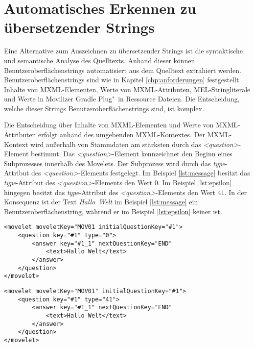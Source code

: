 \section{Automatisches Erkennen zu übersetzender Strings}
Eine Alternative zum Auszeichnen zu übersetzender Strings ist die syntaktische und semantische Analyse des Quelltexts. Anhand dieser können Benutzeroberflächenstrings automatisiert aus dem Quelltext extrahiert werden.
\autocite[Vgl.][S. 556]{Wang.2009}
\autocite[Vgl.][S. 6]{Leiva.2015}
Benutzeroberflächenstrings sind wie in Kapitel \ref{chp:anforderungen} festgestellt Inhalte von \ac{MXML}-Elementen, Werte von \ac{MXML}-Attributen, \ac{MEL}-Stringliterale und Werte in Movilizer Gradle Plug"~in Ressource Dateien.
Die Entscheidung, welche dieser Strings Benutzeroberflächenstrings sind, ist komplex.
\par
Die Entscheidung über Inhalte von \ac{MXML}-Elementen und Werte von \ac{MXML}-Attributen erfolgt anhand des umgebenden \ac{MXML}-Kontextes. Der \ac{MXML}-Kontext wird außerhalb von Stammdaten am stärksten durch das \mbox{\textit{<question>}}-Element bestimmt. Das \mbox{\textit{<question>}}-Element kennzeichnet den Beginn eines Subprozesses innerhalb des Movelets. Der Subprozess wird durch das \mbox{\textit{type}}-Attribut des \mbox{\textit{<question>}}-Elements festgelegt. Im Beispiel \ref{lst:message} besitzt das \mbox{\textit{type}}-Attribut des \mbox{\textit{<question>}}-Elements den Wert $0$.
Im Beispiel \ref{lst:epsilon} hingegen besitzt das \mbox{\textit{type}}-Attribut des \mbox{\textit{<question>}}-Elements den Wert $41$. In der Konsequenz ist der Text \mbox{\textit{Hallo Welt}} im Beispiel \ref{lst:message} ein Benutzeroberflächenstring, während er im Beispiel \ref{lst:epsilon} keiner ist.
\autocite[Vgl.][]{Nitschkowski.2016c}
\autocite[Vgl.][]{Nitschkowski.2018b}

\begin{lstlisting}[caption={Message Screen},
label={lst:message}]
<movelet moveletKey="MOV01 initialQuestionKey="#1">
	<question key="#1" type="0">
		<answer key="#1_1" nextQuestionKey="END" 
			<text>Hallo Welt</text>
		</answer>
	</question>
</movelet>
\end{lstlisting}

\begin{lstlisting}[caption={Epsilon Screen},
label={lst:epsilon}]
<movelet moveletKey="MOV01" initialQuestionKey="#1">
	<question key="#1" type="41">
		<answer key="#1_1" nextQuestionKey="END" 
			<text>Hallo Welt</text>
		</answer>
	</question>
</movelet>
\end{lstlisting}

